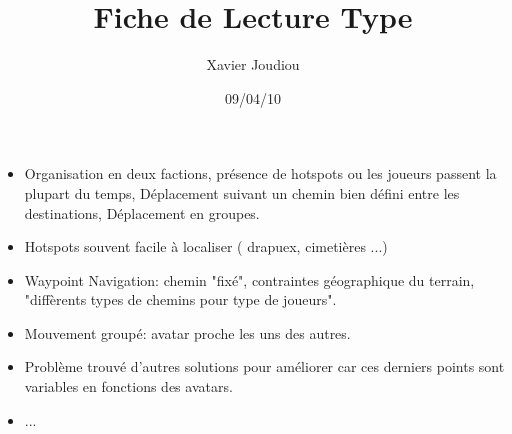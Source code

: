 \documentclass[11pt,a4paper]{article}
\title{Fiche de Lecture Type}
\author{Xavier Joudiou}
\date{09/04/10}
\begin{document}
	
  \begin{itemize}
  \renewcommand{\labelitemi}{$\Rightarrow$}
	\item Organisation en deux factions, présence de hotspots ou les joueurs passent la plupart du temps, Déplacement suivant un chemin bien défini entre les destinations, Déplacement en groupes. 
	\item Hotspots souvent facile à localiser ( drapuex, cimetières ...)
	\item Waypoint Navigation: chemin "fixé", contraintes géographique du terrain, "diffèrents types de chemins pour type de joueurs".
	\item Mouvement groupé: avatar proche les uns des autres.
	\item Problème trouvé d'autres solutions pour améliorer car ces derniers points sont variables en fonctions des avatars.
	\item ...
  \end{itemize}
\end{document}
